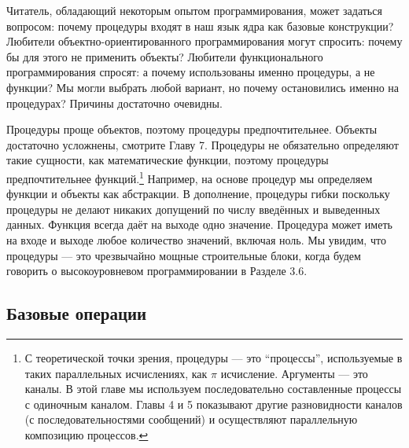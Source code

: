 Читатель, обладающий некоторым опытом программирования, может задаться вопросом: почему процедуры входят в наш язык ядра как базовые конструкции? Любители объектно-ориентированного программирования могут спросить: почему бы для этого не применить объекты? Любители функционального программирования спросят: а почему использованы именно процедуры, а не функции? Мы могли выбрать любой вариант, но почему остановились именно на процедурах? Причины достаточно очевидны.

Процедуры проще объектов, поэтому процедуры предпочтительнее. Объекты достаточно усложнены, смотрите Главу 7. Процедуры не обязательно определяют такие сущности, как математические функции, поэтому процедуры предпочтительнее функций.\footnote{С теоретической точки зрения, процедуры --- это ``процессы'', используемые в таких параллельных исчислениях, как $\pi$ исчисление. Аргументы --- это каналы. В этой главе мы используем последовательно составленные процессы с одиночным каналом. Главы 4 и 5 показывают другие разновидности каналов (с последовательностями сообщений) и осуществляют параллельную композицию процессов.} Например, на основе процедур мы определяем функции и объекты как абстракции. В дополнение, процедуры гибки поскольку процедуры не делают никаких допущений по числу введённых и выведенных данных. Функция всегда даёт на выходе одно значение. Процедура может иметь на входе и выходе любое количество значений, включая ноль. Мы увидим, что процедуры --- это чрезвычайно мощные строительные блоки, когда будем говорить о высокоуровневом программировании в Разделе 3.6.

\subsection{Базовые операции}\label{subsection:basic_operations}

